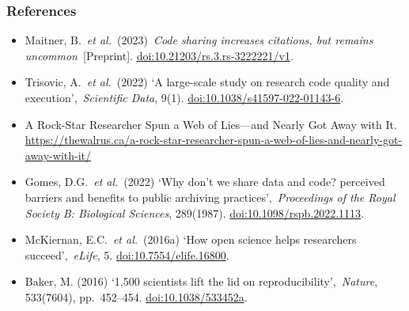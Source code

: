 \documentclass[
]{article}
\providecommand{\tightlist}{%
  \setlength{\itemsep}{0pt}\setlength{\parskip}{0pt}}
\begin{document}
\subsubsection{References}\label{references-1}

\begin{itemize}
\tightlist
\item
  Maitner, B.~\emph{et al.}~(2023)~\emph{Code sharing increases
  citations, but remains uncommon}~{[}Preprint{]}.
  \url{doi:10.21203/rs.3.rs-3222221/v1}.~
\item
  Trisovic, A.~\emph{et al.}~(2022) `A large-scale study on research
  code quality and execution',~\emph{Scientific Data}, 9(1).
  \url{doi:10.1038/s41597-022-01143-6}.~
\item
  A Rock-Star Researcher Spun a Web of Lies---and Nearly Got Away with
  It.
  \url{https://thewalrus.ca/a-rock-star-researcher-spun-a-web-of-lies-and-nearly-got-away-with-it/}
\item
  Gomes, D.G.~\emph{et al.}~(2022) `Why don't we share data and code?
  perceived barriers and benefits to public archiving
  practices',~\emph{Proceedings of the Royal Society B: Biological
  Sciences}, 289(1987). \url{doi:10.1098/rspb.2022.1113}.~
\item
  McKiernan, E.C.~\emph{et al.}~(2016a) `How open science helps
  researchers succeed',~\emph{eLife}, 5. \url{doi:10.7554/elife.16800}.~
\item
  Baker, M. (2016) `1,500 scientists lift the lid on
  reproducibility',~\emph{Nature}, 533(7604), pp.~452--454.
  \url{doi:10.1038/533452a}.~
\end{itemize}
\end{document}
